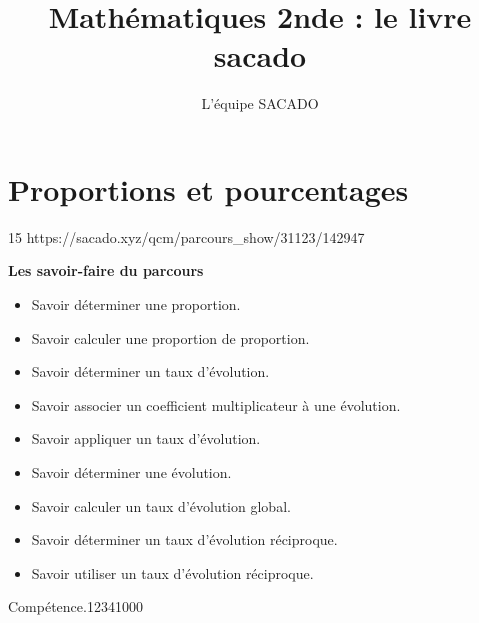 



\title{Mathématiques 2nde  : le livre sacado}
\author{L'équipe SACADO}




\chapter{Proportions et pourcentages }{15}
{https://sacado.xyz/qcm/parcours_show/31123/142947}
{
 \begin{CpsCol}
	\textbf{Les savoir-faire du parcours}
 	\begin{itemize}
 		\item Savoir déterminer une proportion.
		\item Savoir calculer une proportion de proportion.
		\item Savoir déterminer un taux d'évolution.
		\item Savoir associer un coefficient multiplicateur à une évolution.
		\item Savoir appliquer un taux d'évolution.
		\item Savoir déterminer une évolution.
		\item Savoir calculer un taux d'évolution global.
		\item Savoir déterminer un taux d'évolution réciproque.
		\item Savoir utiliser un taux d'évolution réciproque.
 	\end{itemize}
 \end{CpsCol}

\begin{His}
\end{His}

\begin{ExoDec}{Compétence.}{1234}{1}{0}{0}{0}
\end{ExoDec}
}


